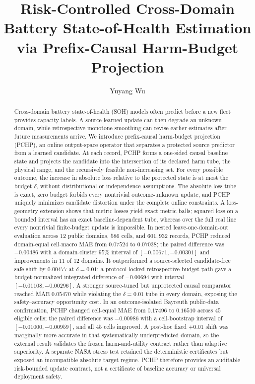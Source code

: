 \documentclass[11pt]{article}
\title{\textbf{Risk-Controlled Cross-Domain Battery State-of-Health Estimation via Prefix-Causal Harm-Budget Projection}}
\author{Yuyang Wu}
\date{}
\begin{document}
\maketitle

\begin{abstract}
Cross-domain battery state-of-health (SOH) models often predict before a new fleet provides capacity labels. A source-learned update can then degrade an unknown domain, while retrospective monotone smoothing can revise earlier estimates after future measurements arrive. We introduce prefix-causal harm-budget projection (PCHP), an online output-space operator that separates a protected source predictor from a learned candidate. At each record, PCHP forms a one-sided causal baseline state and projects the candidate into the intersection of its declared harm tube, the physical range, and the recursively feasible non-increasing set. For every possible outcome, the increase in absolute loss relative to the protected state is at most the budget $\delta$, without distributional or independence assumptions. The absolute-loss tube is exact, zero budget forbids every nontrivial outcome-unknown update, and PCHP uniquely minimizes candidate distortion under the complete online constraints. A loss-geometry extension shows that metric losses yield exact metric balls; squared loss on a bounded interval has an exact baseline-dependent tube, whereas over the full real line every nontrivial finite-budget update is impossible. In nested leave-one-domain-out evaluation across $12$ public domains, $586$ cells, and $601{,}932$ records, PCHP reduced domain-equal cell-macro MAE from $0.07524$ to $0.07038$; the paired difference was $-0.00486$ with a domain-cluster $95\%$ interval of $[-0.00671,-0.00301]$ and improvements in $11$ of $12$ domains. It outperformed a source-selected candidate-free safe shift by $0.00477$ at $\delta=0.01$; a protocol-locked retrospective budget path gave a budget-normalized integrated difference of $-0.00694$ with interval $[-0.01108,-0.00296]$. A stronger source-tuned but unprotected causal comparator reached MAE $0.05470$ while violating the $\delta=0.01$ tube in every domain, exposing the safety--accuracy opportunity cost. In an outcome-isolated Bayreuth public-data confirmation, PCHP changed cell-equal MAE from $0.17496$ to $0.16510$ across $45$ eligible cells; the paired difference was $-0.00986$ with a cell-bootstrap interval of $[-0.01000,-0.00959]$, and all $45$ cells improved. A post-hoc fixed $+0.01$ shift was marginally more accurate in that systematically underpredicted domain, so the external result validates the frozen harm-and-utility contract rather than adaptive superiority. A separate NASA stress test retained the deterministic certificates but exposed an incompatible absolute target regime. PCHP therefore provides an auditable risk-bounded update contract, not a certificate of baseline accuracy or universal deployment safety.
\end{abstract}
\end{document}
